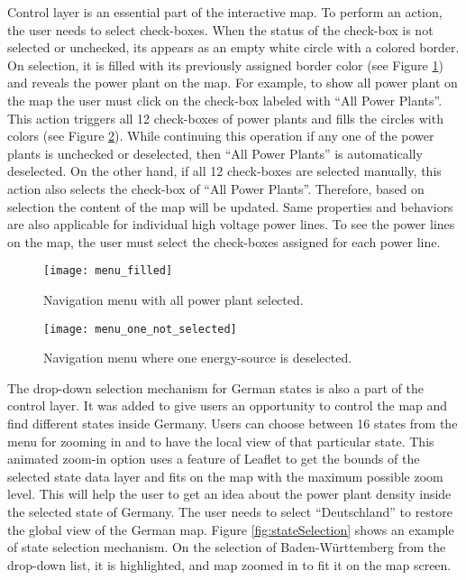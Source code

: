 Control layer is an essential part of the interactive map. To perform an action, the user needs to select check-boxes. When the status of the check-box is not selected or unchecked, its appears as an empty white circle with a colored border. On selection, it is filled with its previously assigned border color (see Figure \ref{fig:menufilled}) and reveals the power plant on the map. For example, to show all power plant on the map the user must click on the check-box labeled with “All Power Plants”. This action triggers all 12 check-boxes of power plants and fills the circles with colors (see Figure \ref{fig:menu2}). While continuing this operation if any one of the power plants is unchecked or deselected, then “All Power Plants” is automatically deselected.  On the other hand, if all 12 check-boxes are selected manually, this action also selects the check-box of “All Power Plants”. Therefore, based on selection the content of the map will be updated. Same properties and behaviors are also applicable for individual high voltage power lines. To see the power lines on the map, the user must select the check-boxes assigned for each power line. 

\begin{figure} [H]
  \begin{center}
    \texttt{[image: menu\_filled]}
    \caption{Navigation menu with all power plant selected.}
    \label{fig:menufilled}
  \end{center}
\end{figure}

\begin{figure} [H]
  \begin{center}
    \texttt{[image: menu\_one\_not\_selected]}
    \caption{Navigation menu where one energy-source is deselected.}
    \label{fig:menu2}
  \end{center}
\end{figure}

The drop-down selection mechanism for German states is also a part of the control layer. It was added to give users an opportunity to control the map and find different states inside Germany. Users can choose between 16 states from the menu for zooming in and to have the local view of that particular state. This animated zoom-in option uses a feature of Leaflet to get the bounds of the selected state data layer and fits on the map with the maximum possible zoom level. This will help the user to get an idea about the power plant density inside the selected state of Germany. The user needs to select “Deutschland” to restore the global view of the German map. Figure \ref{fig:stateSelection} shows an example of state selection mechanism. On the selection of Baden-Württemberg from the drop-down list, it is highlighted, and map zoomed in to fit it on the map screen.

